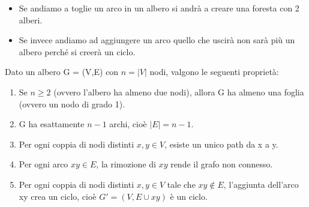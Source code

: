 \begin{itemize}
    \item Se andiamo a toglie un arco in un albero si andrà a creare una foresta con 2 alberi.
    \item Se invece andiamo ad aggiungere un arco quello che uscirà non sarà più un albero perché si creerà un ciclo.
\end{itemize}


\begin{proposition}
    Dato un albero G = (V,E) con $n = |V|$ nodi, valgono le seguenti proprietà:
    \begin{enumerate}
        \item Se $n \geq 2$ (ovvero l'albero ha almeno due nodi), allora G ha almeno una foglia (ovvero un nodo di grado 1).
        \item G ha esattamente $n-1$ archi, cioè $|E| = n-1$.
        \item Per ogni coppia di nodi distinti $x,y \in V$, esiste un unico path da x a y.
        \item Per ogni arco $xy \in E$, la rimozione di $xy$ rende il grafo non connesso.
        \item Per ogni coppia di nodi distinti $x,y \in V$ tale che $xy \notin E$, l'aggiunta dell'arco xy crea un ciclo, cioè $G' = (V, E \cup {xy})$ è un ciclo.
    \end{enumerate}
\end{proposition}


